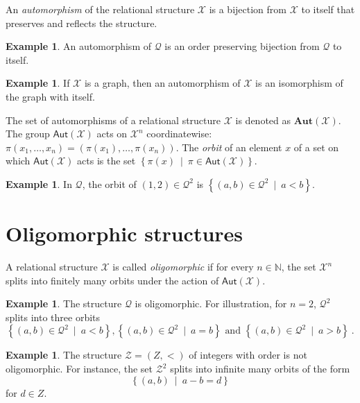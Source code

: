 \documentclass[12pt,a4paper,article]{memoir}
\newcommand{\struct}{\mathcal{X}}
\newcommand{\dloQ}{\mathcal{Q}}
\newcommand{\ordZ}{\mathcal{Z}}
\newcommand{\N}{\mathbb{N}}
\newcommand{\aut}[1]{\mathsf{Aut}\left(#1\right)}
\newcommand{\setof}[2]{\left\{#1\ \mid\ #2 \right\}}
\newcommand{\emphdef}[1]{\emph{\textcolor{BrickRed}{#1}}}
\theoremstyle{definition}
\newtheorem{example}[theorem]{Example}
\begin{document}
An \emphdef{automorphism} of the relational structure $\struct$ is a bijection from $\struct$ to itself that preserves and reflects the structure.
%
\begin{example}
An automorphism of $\dloQ$ is an order preserving bijection from $\mathcal{Q}$ to itself.
\end{example}
%
\begin{example}
If $\struct$ is a graph,
then an automorphism of $\struct$ is an isomorphism of the graph with itself.
\end{example}
%
The set of automorphisms of a relational structure $\struct$ is denoted as \emphdef{$\mathbf{Aut}(\struct)$}.
The group $\aut{\struct}$ acts on $\struct^n$ coordinatewise:
$\pi(x_1,\dots,x_n) = (\pi(x_1),\dots,\pi(x_n))$.
The \emphdef{orbit} of an element $x$ of a set on which $\aut{\struct}$ acts is the set $\setof{\pi(x)}{\pi\in\aut{\struct}}$.
%
\begin{example}
In $\dloQ$, the orbit of $(1,2)\in\dloQ^2$ is $\setof{(a,b)\in\dloQ^2}{a<b}$.
\end{example}
%
\section{Oligomorphic structures}
%
A relational structure $\struct$ is called \emphdef{oligomorphic} if for every $n\in\N$,
the set $\struct^n$ splits into finitely many orbits under the action of $\aut{\struct}$.
%
\begin{example}
The structure $\dloQ$ is oligomorphic.
For illustration, for $n = 2$, $\dloQ^2$ splits into three orbits
\[
\setof{(a,b)\in\dloQ^2}{a < b},
\setof{(a,b)\in\dloQ^2}{a = b}
\text{ and }
\setof{(a,b)\in\dloQ^2}{a > b} \ .
\]
\end{example}
%
\begin{example}
The structure $\ordZ = (Z,<)$ of integers with order is not oligomorphic.
For instance,
the set $\ordZ^2$ splits into infinite many orbits of the form
\[
\setof{(a,b)}{a - b = d}
\]
for $d\in Z$.
\end{example}
%
\end{document}
